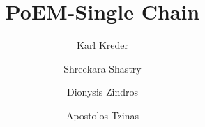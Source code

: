\title{PoEM-Single Chain}
\ifanonymous{\iflncs
\author{}\institute{}
\fi}
\else
\author{
        Karl Kreder \and
        Shreekara Shastry \and
        Dionysis Zindros \and
        Apostolos Tzinas
}
